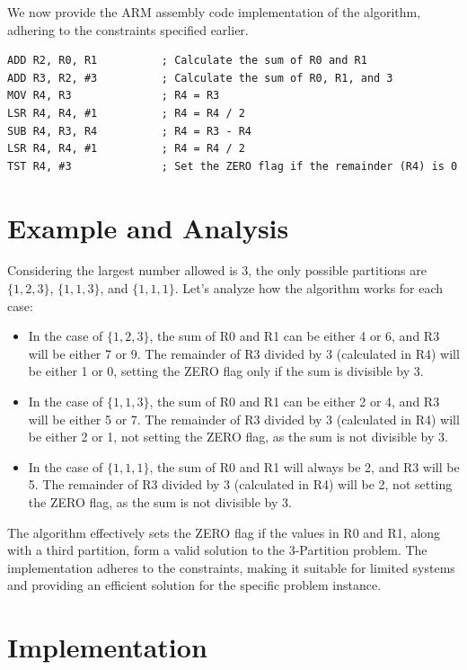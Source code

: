We now provide the ARM assembly code implementation of the algorithm, adhering to the constraints specified earlier.

\begin{verbatim}
ADD R2, R0, R1          ; Calculate the sum of R0 and R1
ADD R3, R2, #3          ; Calculate the sum of R0, R1, and 3
MOV R4, R3              ; R4 = R3
LSR R4, R4, #1          ; R4 = R4 / 2
SUB R4, R3, R4          ; R4 = R3 - R4
LSR R4, R4, #1          ; R4 = R4 / 2
TST R4, #3              ; Set the ZERO flag if the remainder (R4) is 0
\end{verbatim}

\section{Example and Analysis}

Considering the largest number allowed is 3, the only possible partitions are $\{1, 2, 3\}$, $\{1, 1, 3\}$, and $\{1, 1, 1\}$. Let's analyze how the algorithm works for each case:

\begin{itemize}
    \item In the case of $\{1, 2, 3\}$, the sum of R0 and R1 can be either 4 or 6, and R3 will be either 7 or 9. The remainder of R3 divided by 3 (calculated in R4) will be either 1 or 0, setting the ZERO flag only if the sum is divisible by 3.
    \item In the case of $\{1, 1, 3\}$, the sum of R0 and R1 can be either 2 or 4, and R3 will be either 5 or 7. The remainder of R3 divided by 3 (calculated in R4) will be either 2 or 1, not setting the ZERO flag, as the sum is not divisible by 3.
    \item In the case of $\{1, 1, 1\}$, the sum of R0 and R1 will always be 2, and R3 will be 5. The remainder of R3 divided by 3 (calculated in R4) will be 2, not setting the ZERO flag, as the sum is not divisible by 3.
\end{itemize}

The algorithm effectively sets the ZERO flag if the values in R0 and R1, along with a third partition, form a valid solution to the 3-Partition problem. The implementation adheres to the constraints, making it suitable for limited systems and providing an efficient solution for the specific problem instance.



\section{Implementation}

